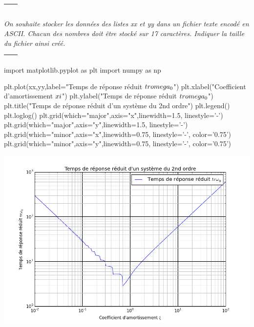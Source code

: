 \documentclass[10pt]{article}
\newif\ifprof
\begin{document}
\begin{tabular}{|p{}|}
\hline
$$\quad$$
\vspace{3cm}
$$\quad$$ \\
\hline
\end{tabular}

\fi

\subparagraph{}
\textit{On souhaite stocker les données des listes \textsf{xx} et \textsf{yy} dans un fichier texte encodé en ASCII. Chacun des nombres doit être stocké sur 17 caractères. Indiquer la taille du fichier ainsi créé.}
\ifprof
\begin{corrige}
90 valeurs sont calculées pour chaque intervalles de $z$. $xx$ et $yy$ ont donc une taille de 360 éléments. 
En prenant en compte les 34 caractères, l'espace et le retour à la ligne (2 caractères), une ligne a donc une taille de 37 octets. Le fichier sera donc d'approximativement de 13 320 octets.
\end{corrige}
\else

\begin{tabular}{|p{}|}
\hline
$$\quad$$
\vspace{2cm}
$$\quad$$ \\
\hline
\end{tabular}

\fi
\ifprof
\else

\begin{py}
\begin{python}
import matplotlib.pyplot as plt
import numpy as np

plt.plot(xx,yy,label="Temps de réponse réduit $tr \\omega_0$")
plt.xlabel("Coefficient d'amortissement $\\xi$")
plt.ylabel("Temps de réponse réduit $tr \\omega_0$")
plt.title("Temps de réponse réduit d'un système du 2nd ordre")
plt.legend()
plt.loglog()
plt.grid(which="major",axis="x",linewidth=1.5, linestyle='-')
plt.grid(which="major",axis="y",linewidth=1.5, linestyle='-')
plt.grid(which="minor",axis="x",linewidth=0.75, linestyle='-', color='0.75')
plt.grid(which="minor",axis="y",linewidth=0.75, linestyle='-', color='0.75')
\end{python}
\end{py}

\begin{center}
\includegraphics[width=.8\linewidth]{images/figure_1}
\end{center}
\fi
\end{document}
